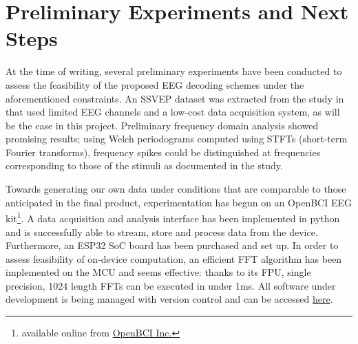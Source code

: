 \section{Preliminary Experiments and Next Steps}
At the time of writing, several preliminary experiments have been conducted to assess the feasibility of the proposed EEG decoding schemes under the aforementioned constraints. An SSVEP dataset  was extracted from the study in \cite{Acampora2021} that used limited EEG channels and a low-cost data acquisition system, as will be the case in this project. Preliminary frequency domain analysis showed promising results; using Welch periodograms computed using STFTs (short-term Fourier transforms), frequency spikes could be distinguished at frequencies corresponding to those of the stimuli as documented in the study.

Towards generating our own data under conditions that are comparable to those anticipated in the final product, experimentation has begun on an OpenBCI EEG kit\footnote{available online from \href{https://shop.openbci.com/products/bundle2?variant=13036379766856}{OpenBCI Inc.}}. A data acquisition and analysis interface has been implemented in python and is successfully able to stream, store and process data from the device. Furthermore, an ESP32 SoC board has been purchased and set up. In order to assess feasibility of on-device computation, an efficient FFT algorithm has been implemented on the MCU and seems effective: thanks to its FPU, single precision, 1024 length FFTs can be executed in under 1ms. All software under development is being managed with version control and can be accessed \href{https://github.com/JamesTev/EEG-decoding}{here}.




